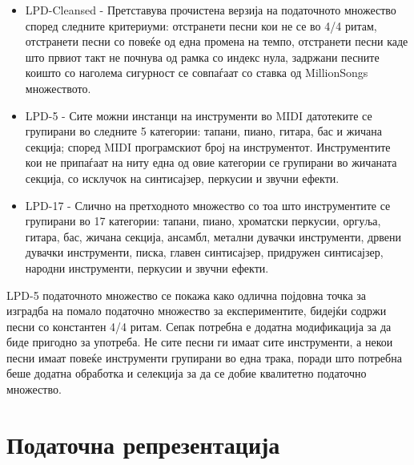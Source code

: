 \begin{itemize}
    \item LPD-Cleansed - Претставува прочистена верзија на податочното множество според следните критериуми: отстранети песни кои не се во 4/4 ритам, отстранети песни со повеќе од една промена на темпо, отстранети песни каде што првиот такт не почнува од рамка со индекс нула, задржани песните коишто со наголема сигурност се совпаѓаат со ставка од MillionSongs множеството.
    \item LPD-5 - Сите можни инстанци на инструменти во MIDI датотеките се групирани во следните 5 категории: тапани, пиано, гитара, бас и жичана секција; според MIDI програмскиот број на инструментот. Инструментите кои не припаѓаат на ниту една од овие категории се групирани во жичаната секција, со исклучок на синтисајзер, перкусии и звучни ефекти.
    \item LPD-17 - Слично на претходното множество со тоа што инструментите се групирани во 17 категории: тапани, пиано, хроматски перкусии, оргуља, гитара, бас, жичана секција, ансамбл, метални дувачки инструменти, дрвени дувачки инструменти, писка, главен синтисајзер, придружен синтисајзер, народни инструменти, перкусии и звучни ефекти.
\end{itemize}

LPD-5 податочното множество се покажа како одлична појдовна точка за изградба на помало податочно множество за експериментите, бидејќи содржи песни со константен 4/4 ритам. Сепак потребна е додатна модификација за да биде пригодно за употреба. Не сите песни ги имаат сите инструменти, а некои песни имаат повеќе инструменти групирани во една трака, поради што потребна беше додатна обработка и селекција за да се добие квалитетно податочно множество.

\section{Податочна репрезентација}

